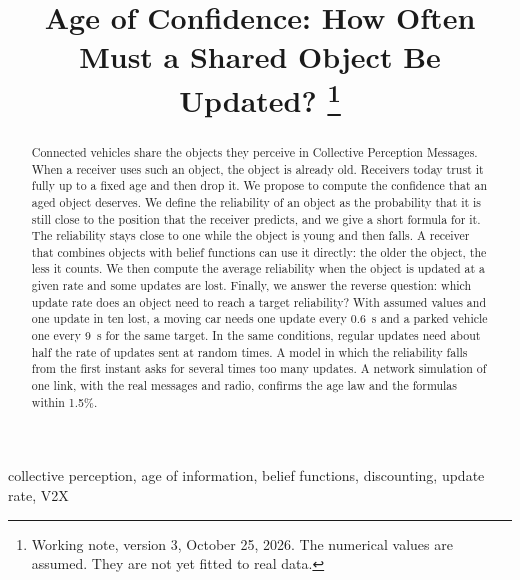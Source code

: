 \documentclass[conference]{IEEEtran}
\begin{document}
\title{Age of Confidence: How Often Must a Shared Object Be Updated?%
\thanks{Working note, version 3, October 25, 2026. The numerical values are
assumed. They are not yet fitted to real data.}}

\author{
}

\maketitle

\begin{abstract}
Connected vehicles share the objects they perceive in Collective Perception
Messages. When a receiver uses such an object, the object is already old.
Receivers today trust it fully up to a fixed age and then drop it. We propose
to compute the confidence that an aged object deserves. We define the
reliability of an object as the probability that it is still close to the
position that the receiver predicts, and we give a short formula for it. The
reliability stays close to one while the object is young and then falls. A
receiver that combines objects with belief functions can use it directly: the
older the object, the less it counts. We then compute the average reliability
when the object is updated at a given rate and some updates are lost. Finally,
we answer the reverse question: which update rate does an object need to reach
a target reliability? With assumed values and one update in ten lost, a moving
car needs one update every 0.6~s and a parked vehicle one every 9~s for the
same target. In the same conditions, regular updates need about half the rate
of updates sent at random times. A model in which the reliability falls from
the first instant asks for several times too many updates. A network
simulation of one link, with the real messages and radio, confirms the age
law and the formulas within 1.5\%.
\end{abstract}

\begin{IEEEkeywords}
collective perception, age of information, belief functions, discounting,
update rate, V2X
\end{IEEEkeywords}

\end{document}

